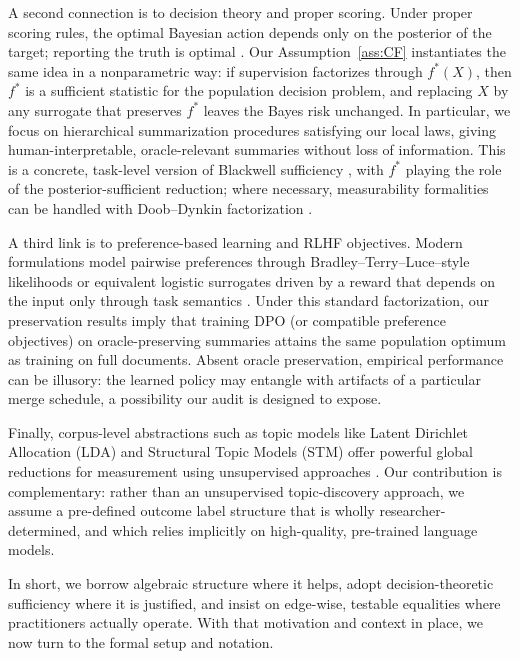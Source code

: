 \documentclass[11pt]{article}
\newcommand{\fstar}{f^*}               %
\begin{document}
A second connection is to decision theory and proper scoring. Under proper scoring rules, the optimal Bayesian action depends only on the posterior of the target; reporting the truth is optimal \citep{GneitingRaftery2007,Dawid2007}. Our Assumption~\ref{ass:CF} instantiates the same idea in a nonparametric way: if supervision factorizes through $\fstar(X)$, then $\fstar$ is a sufficient statistic for the population decision problem, and replacing $X$ by any surrogate that preserves $\fstar$ leaves the Bayes risk unchanged. In particular, we focus on hierarchical summarization procedures satisfying our local laws, giving human-interpretable, oracle-relevant summaries without loss of information. This is a concrete, task-level version of Blackwell sufficiency \citep{Blackwell1953,Torgersen1991}, with $\fstar$ playing the role of the posterior-sufficient reduction; where necessary, measurability formalities can be handled with Doob–Dynkin factorization \citep[see e.g.][Lemma~1.13]{Kallenberg2002FMP}. 

A third link is to preference-based learning and RLHF objectives. Modern formulations model pairwise preferences through Bradley–Terry–Luce–style likelihoods or equivalent logistic surrogates driven by a reward that depends on the input only through task semantics \citep[e.g.,][]{BradleyTerry1952,RafailovEtAl2023DPO}. Under this standard factorization, our preservation results imply that training DPO (or compatible preference objectives) on oracle-preserving summaries attains the same population optimum as training on full documents. Absent oracle preservation, empirical performance can be illusory: the learned policy may entangle with artifacts of a particular merge schedule, a possibility our audit is designed to expose.

Finally, corpus-level abstractions such as topic models like Latent Dirichlet Allocation (LDA) and Structural Topic Models (STM) offer powerful global reductions for measurement using unsupervised approaches \citep{BleiNgJordan2003,RobertsStewartTingley2014}. Our contribution is complementary: rather than an unsupervised topic-discovery approach, we assume a pre-defined outcome label structure that is wholly researcher-determined, and which relies implicitly on high-quality, pre-trained language models. 

In short, we borrow algebraic structure where it helps, adopt decision-theoretic sufficiency where it is justified, and insist on edge-wise, testable equalities where practitioners actually operate. With that motivation and context in place, we now turn to the formal setup and notation.
\end{document}

